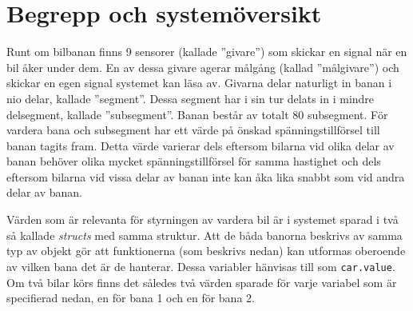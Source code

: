 \section{Begrepp och systemöversikt}

Runt om bilbanan finns 9 sensorer (kallade ''givare'') som skickar en signal när
en bil åker under dem. En av dessa givare agerar målgång (kallad ''målgivare'')
och skickar en egen signal systemet kan läsa av. Givarna delar naturligt in
banan i nio delar, kallade ''segment''. Dessa segment har i sin tur delats in i
mindre delsegment, kallade ''subsegment''. Banan består av totalt 80 subsegment.
För vardera bana och subsegment har ett värde på önskad spänningstillförsel till
banan tagits fram. Detta värde varierar dels eftersom bilarna vid olika delar av
banan behöver olika mycket spänningstillförsel för samma hastighet och dels
eftersom bilarna vid vissa delar av banan inte kan åka lika snabbt som vid andra
delar av banan.

Värden som är relevanta för styrningen av vardera bil är i systemet sparad i
två så kallade \emph{structs} med samma struktur. Att de båda banorna beskrivs
av samma typ av objekt gör att funktionerna (som beskrivs nedan) kan utformas
oberoende av vilken bana det är de hanterar. Dessa variabler hänvisas till som
\texttt{car.value}. Om två bilar körs finns det således två värden sparade för
varje variabel som är specifierad nedan, en för bana 1 och en för bana 2.

